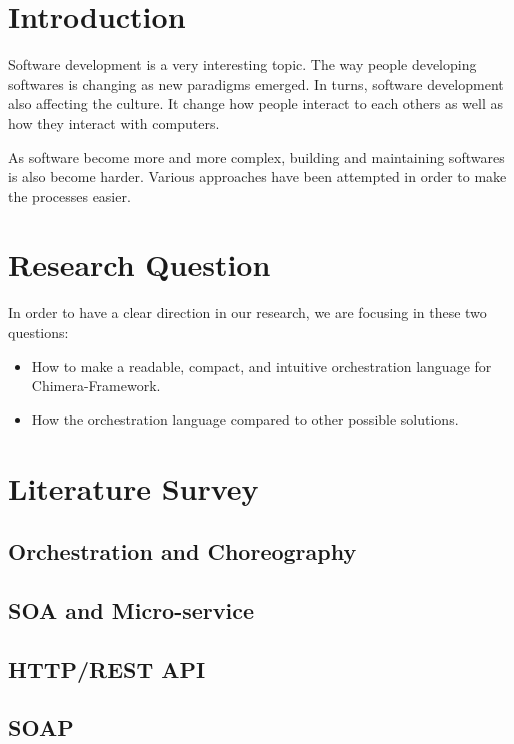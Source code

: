 \documentclass[conference]{IEEEtran}
\begin{document}
\IEEEpeerreviewmaketitle

\section{Introduction}

Software development is a very interesting topic. The way people developing softwares is changing as new paradigms emerged. In turns, software development also affecting the culture. It change how people interact to each others as well as how they interact with computers.

As software become more and more complex, building and maintaining softwares is also become harder. Various approaches have been attempted in order to make the processes easier.

\section{Research Question}

In order to have a clear direction in our research, we are focusing in these two questions:

\begin{itemize}
    \item How to make a readable, compact, and intuitive orchestration language for Chimera-Framework.
    \item How the orchestration language compared to other possible solutions.
\end{itemize}

\section{Literature Survey}

\subsection{Orchestration and Choreography}

\subsection{SOA and Micro-service}

\subsection{HTTP/REST API}

\subsection{SOAP}
\end{document}
